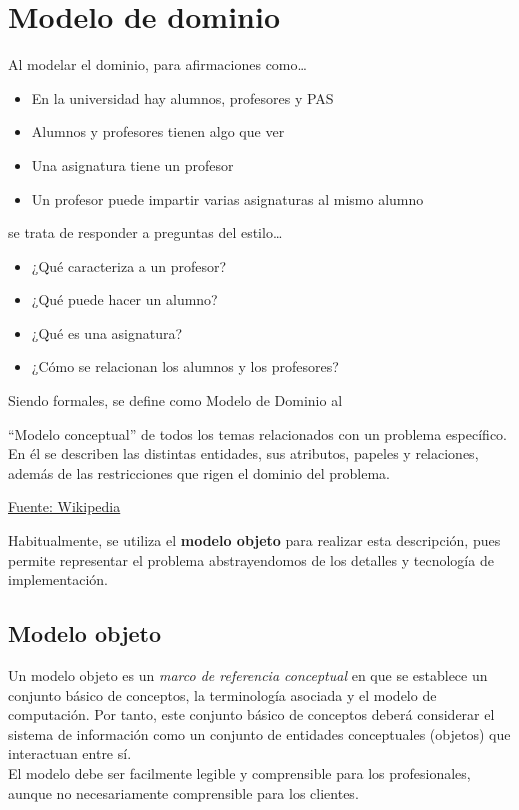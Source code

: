 \section{Modelo de dominio}


Al modelar el dominio, para afirmaciones como\dots

\begin{itemize}
    \item En la universidad hay alumnos, profesores y PAS
    \item Alumnos y profesores tienen algo que ver
    \item Una asignatura tiene un profesor
    \item Un profesor puede impartir varias asignaturas al mismo alumno
\end{itemize}

\noindent se trata de responder a preguntas del estilo\dots

\begin{itemize}
    \item ¿Qué caracteriza a un profesor?
    \item ¿Qué puede hacer un alumno?
    \item ¿Qué es una asignatura?
    \item ¿Cómo se relacionan los alumnos y los profesores?
\end{itemize}

\vspace*{5mm}

\noindent Siendo formales, se define como Modelo de Dominio al

\begin{enfasis}
    ``Modelo conceptual'' de todos los temas relacionados con un problema específico. En él se describen las distintas entidades,
    sus atributos, papeles y relaciones, además de las restricciones que rigen el dominio del problema.

    \href{https://es.wikipedia.org/wiki/Modelo_de_dominio}{Fuente: Wikipedia}
\end{enfasis}

Habitualmente, se utiliza el \textbf{modelo objeto} para realizar esta descripción, pues permite representar el problema
abstrayendomos de los detalles y tecnología de implementación.

\subsection{Modelo objeto}

Un modelo objeto es un \textit{marco de referencia conceptual} en que se establece un conjunto básico de conceptos, la
terminología asociada y el modelo de computación. Por tanto, este conjunto básico de conceptos deberá considerar el sistema de
información como un conjunto de entidades conceptuales (objetos) que interactuan entre sí. \\
El modelo debe ser facilmente legible y comprensible para los profesionales, aunque no necesariamente comprensible para 
los clientes.

